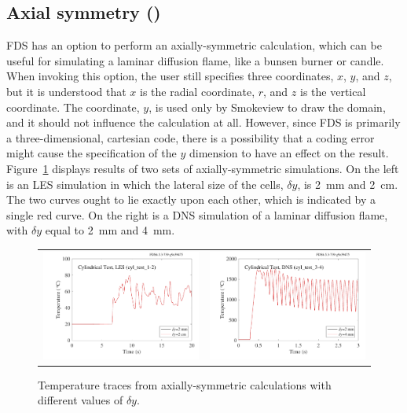 \documentclass[11pt]{book}
\begin{document}
\subsection{Axial symmetry (\texorpdfstring{}{cyl\_test})}
\label{cyl_test}

FDS has an option to perform an axially-symmetric calculation, which can be useful for simulating a laminar diffusion flame, like a bunsen burner or candle. When invoking this option, the user still specifies three coordinates, $x$, $y$, and $z$, but it is understood that $x$ is the radial coordinate, $r$, and $z$ is the vertical coordinate. The coordinate, $y$, is used only by Smokeview to draw the domain, and it should not influence the calculation at all. However, since FDS is primarily a three-dimensional, cartesian code, there is a possibility that a coding error might cause the specification of the $y$ dimension to have an effect on the result. Figure~\ref{cyl_test_fig} displays results of two sets of axially-symmetric simulations. On the left is an LES simulation in which the lateral size of the cells, $\delta y$, is 2~mm and 2~cm. The two curves ought to lie exactly upon each other, which is indicated by a single red curve. On the right is a DNS simulation of a laminar diffusion flame, with $\delta y$ equal to 2~mm and 4~mm.

\begin{figure}[!ht]
\begin{tabular*}{\textwidth}{lr}
\includegraphics[width=3.2in]{SCRIPT_FIGURES/cyl_test} &
\includegraphics[width=3.2in]{SCRIPT_FIGURES/cyl_test_3-4}
\end{tabular*}
\caption[The  test cases]{Temperature traces from axially-symmetric calculations with different values of $\delta y$.}
\label{cyl_test_fig}
\end{figure}
\end{document}

